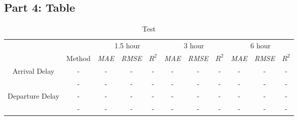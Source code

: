 \documentclass[12pt,a4paper]{report}
\begin{document}
\subsection{Part 4: Table}
\renewcommand{\arraystretch}{0.85}
\begin{table}[h]
    \caption{Test}
    \centering
    \footnotesize
    \begin{tabular}{ccccccccccc}
        \toprule
                                           &        & \multicolumn{3}{c}{1.5 hour} & \multicolumn{3}{c}{3 hour} & \multicolumn{3}{c}{6 hour}                                                                                                    \\
                                           & Method & \textit{MAE}                 & \textit{RMSE}              & \multicolumn{1}{c|}{$R^2$} & \textit{MAE} & \textit{RMSE} & \multicolumn{1}{c|}{$R^2$} & \textit{MAE} & \textit{RMSE} & $R^2$ \\ \midrule
        \multirow{2}{*}{Arrival Delay}   & -   & -                            & -                          & \multicolumn{1}{c|}{-}     & -            & -             & \multicolumn{1}{c|}{-}     & -            & -            & -     \\
                                           & -   & -                            & -                          & \multicolumn{1}{c|}{-}     & -            & -             & \multicolumn{1}{c|}{-}     & -            & -            & -     \\ \midrule
        \multirow{2}{*}{Departure Delay} & -   & -                            & -                          & \multicolumn{1}{c|}{-}     & -            & -             & \multicolumn{1}{c|}{-}     & -            & -            & -     \\
                                           & -   & -                            & -                          & \multicolumn{1}{c|}{-}     & -            & -             & \multicolumn{1}{c|}{-}     & -            & -            & -     \\ \bottomrule
    \end{tabular}
\end{table}
\end{document}
